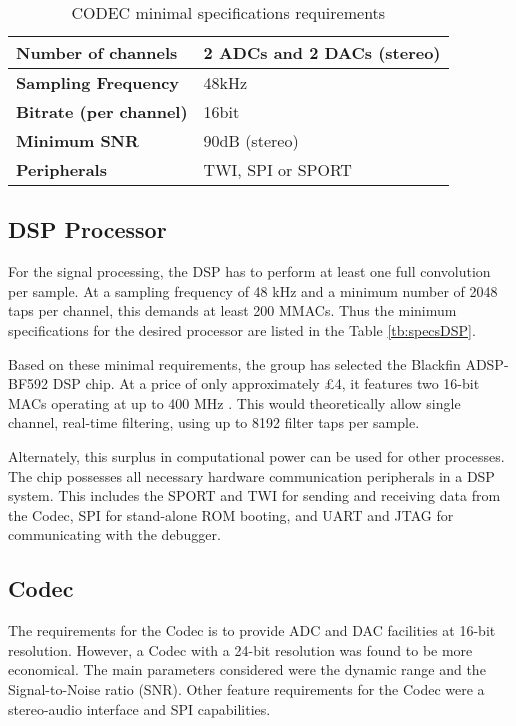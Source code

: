 \begin{table}[h]
	\centering
	\begin{tabular}{|l|l|}
		\hline
		\textbf{Number of channels}            & 2 ADCs and 2 DACs (stereo)                           \\ \hline
		\textbf{Sampling Frequency}            & 48kHz                            \\ \hline
		\textbf{Bitrate (per channel)}         & 16bit                            \\ \hline
		\textbf{Minimum SNR} & 90dB (stereo)                    \\ \hline
		\textbf{Peripherals}                   & TWI, SPI or SPORT \\ \hline
	\end{tabular}
	\caption{CODEC minimal specifications requirements}
	\label{tb:specsCodec}
\end{table}

\subsection{DSP Processor}
For the signal processing, the DSP has to perform at least one full convolution per sample. At a sampling frequency of 48 kHz and a minimum number of 2048 taps per channel, this demands at least 200 MMACs. Thus the minimum specifications for the desired processor are listed in the Table \ref{tb:specsDSP}.


Based on these minimal requirements, the group has selected the Blackfin ADSP-BF592 DSP chip. At a price of only approximately £4, it features two 16-bit MACs operating at up to 400 MHz \autocite{blackfinDSP} . This would theoretically allow single channel, real-time filtering, using up to 8192 filter taps per sample. 

Alternately, this surplus in computational power can be used for other processes. The chip possesses all necessary hardware communication peripherals in a DSP system. This includes the SPORT and TWI for sending and receiving data from the Codec, SPI for stand-alone ROM booting, and UART and JTAG for communicating with the debugger.



\subsection{Codec}
The requirements for the Codec is to provide ADC and DAC facilities at 16-bit resolution. However, a Codec with a 24-bit resolution was found to be more economical. The main parameters considered were the dynamic range and the Signal-to-Noise ratio (SNR). Other feature requirements for the Codec were a stereo-audio interface and SPI capabilities.

